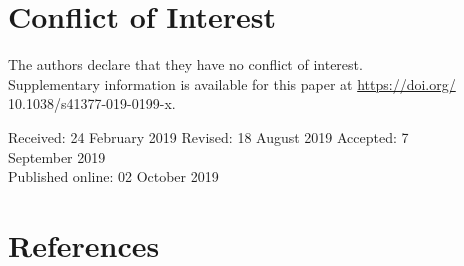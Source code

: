\documentclass[10pt]{article}
\begin{document}
\section*{Conflict of Interest}
The authors declare that they have no conflict of interest.\\
Supplementary information is available for this paper at \href{https://doi.org/}{https://doi.org/} 10.1038/s41377-019-0199-x.

Received: 24 February 2019 Revised: 18 August 2019 Accepted: 7\\
September 2019\\
Published online: 02 October 2019

\section*{References}
\end{document}

